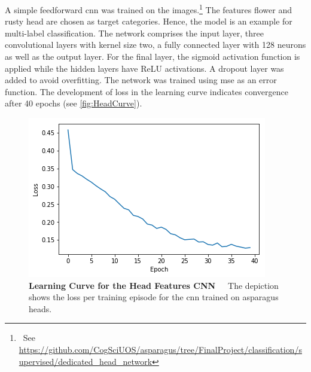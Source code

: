 \bigskip
A simple feedforward \acrshort{cnn} was trained on the images.\footnote{~See \url{https://github.com/CogSciUOS/asparagus/tree/FinalProject/classification/supervised/dedicated\_head\_network}} The features flower and rusty head are chosen as target categories. Hence, the  model is an example for multi-label classification. The network comprises the input layer, three convolutional layers with kernel size two, a fully connected layer with 128 neurons as well as the output layer. For the final layer, the sigmoid activation function is applied while the hidden layers have ReLU activations. A dropout layer was added to avoid overfitting. The network was trained using \acrfull{mse} as an error function. The development of loss in the learning curve indicates convergence after 40 epochs (see \autoref{fig:HeadCurve}).

\begin{table}[!b]
	\centering
	\caption[Head Features CNN Performance]{\textbf{Performance of Head Features CNN}~~~Performance of the \acrshort{cnn} trained on asparagus heads.}
	\label{tab:performance_measures_head_based}
\end{table}

\begin{figure}[!htb]
	\centering
	\includegraphics[scale=1.8]{Figures/chapter04/head_curve.png}
	\decoRule
	\caption[Head Features CNN Learning Curve]{\textbf{Learning Curve for the Head Features CNN}~~~The depiction shows the loss per training episode for the \acrshort{cnn} trained on asparagus heads.}
	\label{fig:HeadCurve}
\end{figure}	

